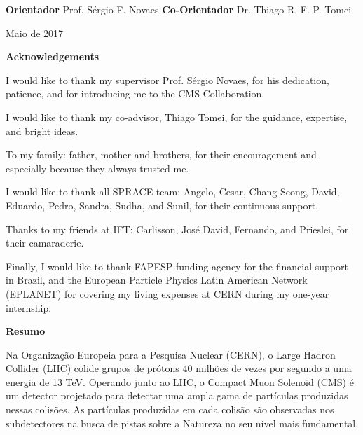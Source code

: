 \vskip 3cm
\hfill \textsf{\textbf{Orientador}}
\vskip 0.1cm
\hfill {\sf Prof. S\'ergio F. Novaes}
\vskip 1cm
\hfill \textsf{\textbf{Co-Orientador}}
\vskip 0.1cm
\hfill {\sf Dr. Thiago R. F. P. Tomei}
\vfill
\begin{center}
{\sf Maio de 2017}
\end{center}

\newpage


\begin{center}
{\LARGE \textsf{\textbf{Acknowledgements}}}
\end{center}
\vskip 2.0cm

I would like to thank my supervisor Prof. S\'ergio Novaes, for his dedication, patience, and for introducing me to the CMS Collaboration.

I would like to thank my co-advisor, Thiago Tomei, for the guidance, expertise, and bright ideas.

To my family: father, mother and brothers, for their encouragement and especially because they always trusted me.

I would like to thank all SPRACE team: Angelo, Cesar, Chang-Seong, David, Eduardo, Pedro, Sandra, Sudha, and Sunil, for their continuous support.

Thanks to my friends at IFT: Carlisson, Jos\'{e} David, Fernando, and Prieslei, for their camaraderie.

Finally, I would like to thank FAPESP funding agency for the financial support in Brazil, and the European Particle Physics Latin American Network (EPLANET) for covering my living expenses at CERN during my one-year internship.


\newpage

\begin{center}
{\LARGE \textsf{\textbf{Resumo}}}
\end{center}
\vskip 2.0cm

Na Organiza\c{c}\~ao Europeia para a Pesquisa Nuclear (CERN), o Large Hadron Collider (LHC) colide grupos de pr\'otons 40 milh\~oes de vezes por segundo a uma energia de 13 TeV. Operando junto ao LHC, o Compact Muon Solenoid (CMS) \'e um detector projetado para detectar uma ampla gama de part\'iculas produzidas nessas colis\~oes.  As part\'iculas produzidas em cada colis\~ao s\~ao observadas nos subdetectores na busca de pistas sobre a Natureza no seu n\'ivel mais fundamental.

